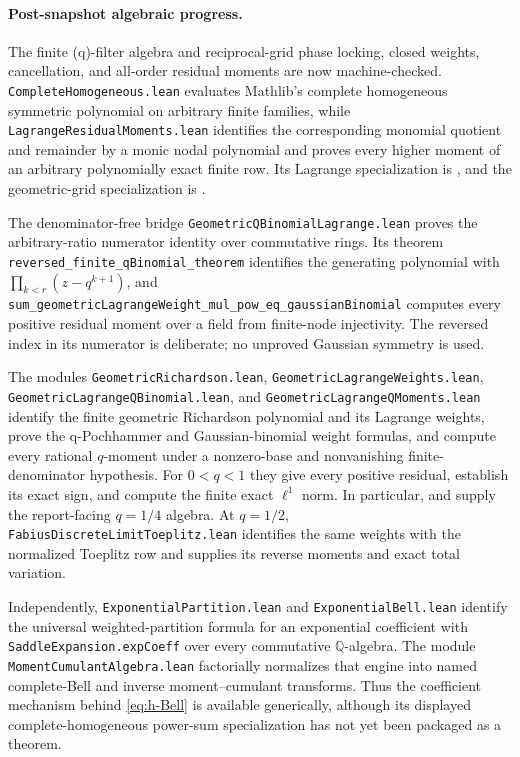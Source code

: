 \documentclass[11pt]{article}
\theoremstyle{definition}
\theoremstyle{remark}
\begin{document}
\paragraph{Post-snapshot algebraic progress.}
The finite (q)-filter algebra and reciprocal-grid phase locking, closed
weights, cancellation, and all-order residual moments are now machine-checked.
\texttt{CompleteHomogeneous.lean} evaluates Mathlib's complete homogeneous
symmetric polynomial on arbitrary finite families, while
\texttt{LagrangeResidualMoments.lean} identifies the corresponding monomial
quotient and remainder by a monic nodal polynomial and proves every higher
moment of an arbitrary polynomially exact finite row.  Its Lagrange
specialization is
, and the geometric-grid
specialization is
.

The denominator-free bridge \texttt{GeometricQBinomialLagrange.lean} proves
the arbitrary-ratio numerator identity over commutative rings.  Its theorem
\texttt{reversed\_finite\_qBinomial\_theorem} identifies the generating
polynomial with \(\prod_{k<r}(z-q^{k+1})\), and
\texttt{sum\_geometricLagrangeWeight\_mul\_pow\_eq\_gaussianBinomial}
computes every positive residual moment over a field from finite-node
injectivity.  The reversed index in its numerator is deliberate; no
unproved Gaussian symmetry is used.

The modules \texttt{GeometricRichardson.lean},
\texttt{GeometricLagrangeWeights.lean},
\texttt{GeometricLagrangeQBinomial.lean}, and
\texttt{GeometricLagrangeQMoments.lean} identify the finite geometric
Richardson polynomial and its Lagrange weights, prove the q-Pochhammer and
Gaussian-binomial weight formulas, and compute every rational \(q\)-moment
under a nonzero-base and nonvanishing finite-denominator hypothesis.  For
\(0<q<1\) they give every positive residual, establish its exact sign, and
compute the finite exact \(\ell^1\) norm.  In particular,
 and
 supply the
report-facing \(q=1/4\) algebra.  At \(q=1/2\),
\texttt{FabiusDiscreteLimitToeplitz.lean} identifies the same weights with
the normalized Toeplitz row and supplies its reverse moments and exact total
variation.

Independently, \texttt{ExponentialPartition.lean} and
\texttt{ExponentialBell.lean} identify the universal weighted-partition
formula for an exponential coefficient with
\texttt{SaddleExpansion.expCoeff} over every commutative
\(\mathbb Q\)-algebra.  The module \texttt{MomentCumulantAlgebra.lean}
factorially normalizes that engine into named complete-Bell and inverse
moment--cumulant transforms.  Thus the coefficient mechanism behind
\eqref{eq:h-Bell} is available generically, although its displayed
complete-homogeneous power-sum specialization has not yet been packaged as a
theorem.
\end{document}
